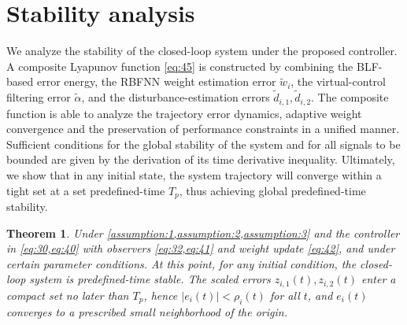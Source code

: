 \documentclass[pdflatex,sn-mathphys-num]{sn-jnl}%
\theoremstyle{thmstyleone}%
\newtheorem{theorem}{Theorem}%
\theoremstyle{thmstyletwo}%
\theoremstyle{thmstylethree}%
\begin{document}


\section{Stability analysis}

 We analyze the stability of the closed-loop system under the proposed controller.  A composite Lyapunov function \cref{eq:45} is constructed by combining the BLF-based error energy, the RBFNN weight estimation error $\tilde w_i$, the virtual-control filtering error $\tilde\alpha$, and the disturbance-estimation errors $\tilde d_{i,1},\tilde d_{i,2}$. The composite function is able to analyze the trajectory error dynamics, adaptive weight convergence and the preservation of performance constraints in a unified manner. Sufficient conditions for the global stability of the system and for all signals to be bounded are given by the derivation of its time derivative inequality. Ultimately, we show that in any initial state, the system trajectory will converge within a tight set at a set predefined-time $T_p$, thus achieving global predefined-time stability.

 \begin{theorem}
	Under \cref{assumption:1,assumption:2,assumption:3} and the controller in \cref{eq:30,eq:40} with observers \cref{eq:32,eq:41} and weight update \cref{eq:42}, and under certain parameter conditions. At this point, for any initial condition, the closed-loop system is predefined-time stable. The scaled errors $z_{i,1}(t),z_{i,2}(t)$ enter a compact set no later than $T_p$, hence $|e_{i}(t)|<\rho_{i}(t)$ for all $t$, and $e_i(t)$ converges to a prescribed small neighborhood of the origin.
	\end{theorem}
\end{document}

